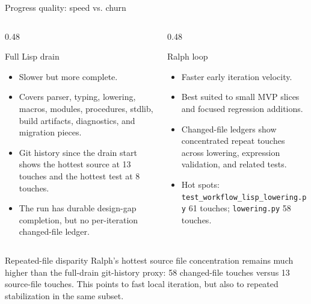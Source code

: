 \documentclass[aspectratio=169]{beamer}
\begin{document}
\begin{frame}[shrink=8]{Progress quality: speed vs. churn}
\small
\begin{columns}[T,totalwidth=\textwidth]
\begin{column}{0.48\textwidth}
\begin{block}{Full Lisp drain}
\begin{itemize}
  \item Slower but more complete.
  \item Covers parser, typing, lowering, macros, modules, procedures, stdlib, build artifacts, diagnostics, and migration pieces.
  \item Git history since the drain start shows the hottest source at 13 touches and the hottest test at 8 touches.
  \item The run has durable design-gap completion, but no per-iteration changed-file ledger.
\end{itemize}
\end{block}
\end{column}
\begin{column}{0.48\textwidth}
\begin{block}{Ralph loop}
\begin{itemize}
  \item Faster early iteration velocity.
  \item Best suited to small MVP slices and focused regression additions.
  \item Changed-file ledgers show concentrated repeat touches across lowering, expression validation, and related tests.
  \item Hot spots: \texttt{test\_workflow\_lisp\_lowering.py} 61 touches; \texttt{lowering.py} 58 touches.
\end{itemize}
\end{block}
\end{column}
\end{columns}
\vspace{0.6em}
\begin{block}{Repeated-file disparity}
Ralph's hottest source file concentration remains much higher than the full-drain git-history proxy: 58 changed-file touches versus 13 source-file touches. This points to fast local iteration, but also to repeated stabilization in the same subset.
\end{block}
\end{frame}
\end{document}
